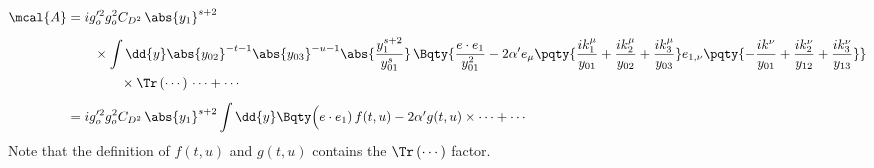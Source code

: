 \documentclass[a4paper,10pt]{article}
\begin{document}
\begin{enumerate}
	\begin{equation}
	\begin{aligned}
		\mcal{A}
		&= ig_o'^2 g_o^2 C_{D^2}\,
			\abs{y_1}^{s+2}
			\\[1ex] & \qquad
			\times \int \dd{y}
				\abs{y_{02}}^{-t-1}
				\abs{y_{03}}^{-u-1}
				\abs{\frac{y_1^{s+2}}{y_{01}^s}}\,
				\Bqty{
					\frac{e\cdot e_1}{y_{01}^2}
					- 2\alpha' e_\mu \pqty{
						\frac{ik_1^\mu}{y_{01}}
						+ \frac{ik_2^\mu}{y_{02}}
						+ \frac{ik_3^\mu}{y_{03}}
					}
					e_{1,\nu} \pqty{
						- \frac{ik^\nu}{y_{01}}
						+ \frac{ik_2^\nu}{y_{12}}
						+ \frac{ik_3^\nu}{y_{13}}
					}
			}
			\\ & \qquad\qquad
			\times \Tr\,(\cdots)\,\cdots + \cdots
	\\[1ex]
		&= ig_o'^2 g_o^2 C_{D^2}\,
			\abs{y_1}^{s+2}
			\int \dd{y} \Bqty\Big{
				(e\cdot e_1)\,f(t,u)
				- 2\alpha' g(t,u)
			} \times \cdots + \cdots
	\end{aligned}
	\end{equation}
	Note that the definition of $f(t,u)$ and $g(t,u)$ contains the $\Tr\,(\cdots)$ factor. 
	

\end{enumerate}
\end{document}
